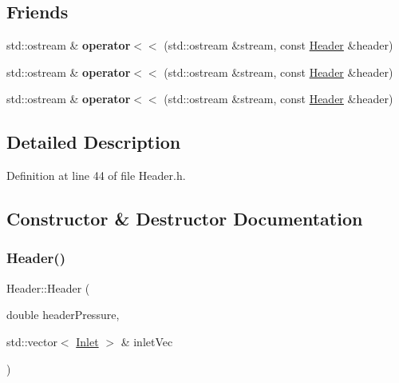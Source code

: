 \subsection*{Friends}
\begin{DoxyCompactItemize}
\item 
\mbox{\label{class_header_a4e40bb16413ee9370f760ece99d4bfb1}} 
std\+::ostream \& {\bfseries operator$<$$<$} (std\+::ostream \&stream, const \hyperlink{class_header}{Header} \&header)
\item 
\mbox{\label{class_header_a4e40bb16413ee9370f760ece99d4bfb1}} 
std\+::ostream \& {\bfseries operator$<$$<$} (std\+::ostream \&stream, const \hyperlink{class_header}{Header} \&header)
\item 
\mbox{\label{class_header_a4e40bb16413ee9370f760ece99d4bfb1}} 
std\+::ostream \& {\bfseries operator$<$$<$} (std\+::ostream \&stream, const \hyperlink{class_header}{Header} \&header)
\end{DoxyCompactItemize}


\subsection{Detailed Description}


Definition at line 44 of file Header.\+h.



\subsection{Constructor \& Destructor Documentation}
\mbox{\label{class_header_a59b836abde0be58bec65ebea1ac67a3b}} 
\subsubsection{\texorpdfstring{Header()}{Header()}\hspace{0.1cm}{\footnotesize\ttfamily [1/3]}}
{\footnotesize\ttfamily Header\+::\+Header (\begin{DoxyParamCaption}\item[{double}]{header\+Pressure,  }\item[{std\+::vector$<$ \hyperlink{class_inlet}{Inlet} $>$ \&}]{inlet\+Vec }\end{DoxyParamCaption})}

